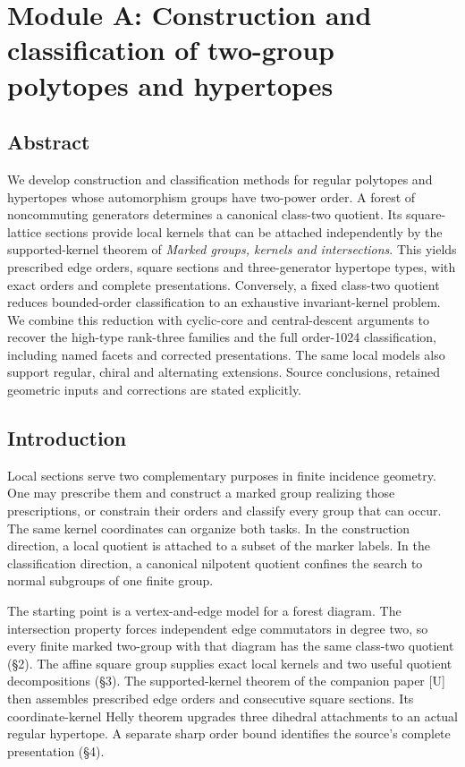 \documentclass[
  11pt,
  a4paper,
]{article}
\author{}
\date{}
\begin{document}
\section{Module A: Construction and classification of two-group
polytopes and
hypertopes}\label{module-a-construction-and-classification-of-two-group-polytopes-and-hypertopes}

\subsection{Abstract}\label{abstract}

We develop construction and classification methods for regular polytopes
and hypertopes whose automorphism groups have two-power order. A forest
of noncommuting generators determines a canonical class-two quotient.
Its square-lattice sections provide local kernels that can be attached
independently by the supported-kernel theorem of \emph{Marked groups,
kernels and intersections}. This yields prescribed edge orders, square
sections and three-generator hypertope types, with exact orders and
complete presentations. Conversely, a fixed class-two quotient reduces
bounded-order classification to an exhaustive invariant-kernel problem.
We combine this reduction with cyclic-core and central-descent arguments
to recover the high-type rank-three families and the full order-1024
classification, including named facets and corrected presentations. The
same local models also support regular, chiral and alternating
extensions. Source conclusions, retained geometric inputs and
corrections are stated explicitly.

\subsection{Introduction}\label{introduction}

Local sections serve two complementary purposes in finite incidence
geometry. One may prescribe them and construct a marked group realizing
those prescriptions, or constrain their orders and classify every group
that can occur. The same kernel coordinates can organize both tasks. In
the construction direction, a local quotient is attached to a subset of
the marker labels. In the classification direction, a canonical
nilpotent quotient confines the search to normal subgroups of one finite
group.

The starting point is a vertex-and-edge model for a forest diagram. The
intersection property forces independent edge commutators in degree two,
so every finite marked two-group with that diagram has the same
class-two quotient (§2). The affine square group supplies exact local
kernels and two useful quotient decompositions (§3). The
supported-kernel theorem of the companion paper {[}U{]} then assembles
prescribed edge orders and consecutive square sections. Its
coordinate-kernel Helly theorem upgrades three dihedral attachments to
an actual regular hypertope. A separate sharp order bound identifies the
source's complete presentation (§4).
\end{document}
